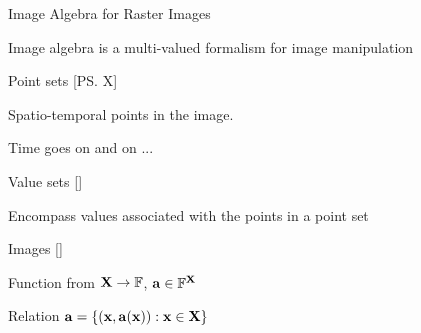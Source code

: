 \documentclass[final,total,bgColor,slideColor,pdf,ps2pdf,default,noaccumulate]{prosper}
\begin{document}
\begin{slide}[R]{Image Algebra for Raster Images}

  Image algebra is a multi-valued formalism for image manipulation

  \begin{Itemize}
  \item Point sets [\ps{X}]
    \begin{Itemize}
    \item Spatio-temporal points in the image.
    \item Time goes on and on ...
    \end{Itemize}
  \item Value sets []
    \begin{Itemize}
    \item Encompass values associated with the points in a point set
%
    \end{Itemize}
  \item Images []
    \begin{Itemize}
    \item Function from ${\bf{X}} \to {\ensuremath{\mathbb{F}}}$,  ${\bf{a}} \in {\ensuremath{\mathbb{F}}}^{{\bf{X}}}$
    \item Relation ${\bf{a}} = \{({\bf{x}},{\bf{a}}({\bf{x}})) : {\bf{x}}
      \in {\ensuremath{\bf{X}}}\}$ \\ 
    \end{Itemize}
  \end{Itemize}
\end{slide}
\end{document}

